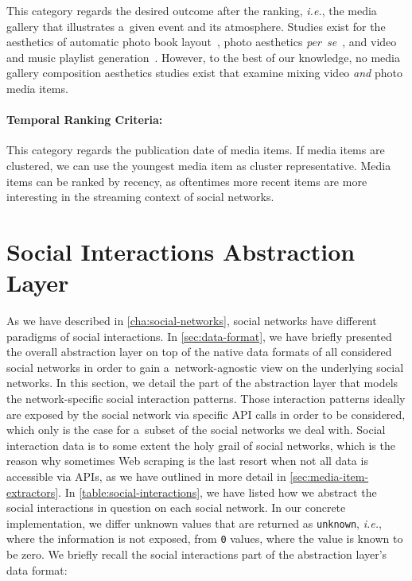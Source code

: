 This category regards the desired outcome after the ranking, \emph{i.e.},
the media gallery that illustrates a~given event and its atmosphere.
Studies exist for the aesthetics of
automatic photo book layout~\cite{sandhaus2011photobook},
photo aesthetics \emph{per~se}~\cite{obrador2012photoaesthetics},
and video and music playlist generation~\cite{knees2006musicplaylist,davidson2010videorecommendation}.
However, to the best of our knowledge,
no media gallery composition aesthetics studies exist
that examine mixing video \emph{and} photo media items.

\paragraph{Temporal Ranking Criteria:}

This category regards the publication date of media items.
If media items are clustered, we can use the youngest media item
as cluster representative.
Media items can be ranked by recency, as oftentimes more recent items
are more interesting in the streaming context of social networks.

\section{Social Interactions Abstraction Layer}
\label{sec:social-interactions-abstraction-layer}

As we have described in \autoref{cha:social-networks},
social networks have different paradigms of social interactions.
In \autoref{sec:data-format}, we have briefly presented the overall
abstraction layer on top of the native data formats
of all considered social networks in order to gain
a~network-agnostic view on the underlying social networks.
In this section, we detail the part of the abstraction layer
that models the network-specific social interaction patterns.
Those interaction patterns ideally are exposed by the social network
via specific API calls in order to be considered,
which only is the case for a~subset of the social networks we deal with.
Social interaction data is to some extent the holy grail of social networks,
which is the reason why sometimes Web scraping is the last resort
when not all data is accessible via APIs,
as we have outlined in more detail in \autoref{sec:media-item-extractors}.
In \autoref{table:social-interactions}, we have listed
how we abstract the social interactions in question on each social network.
In our concrete implementation, we differ unknown values
that are returned as \texttt{unknown}, \emph{i.e.},
where the information is not exposed,
from \texttt{0} values, where the value is known to be zero.
We briefly recall the social interactions part
of the abstraction layer's data format:

